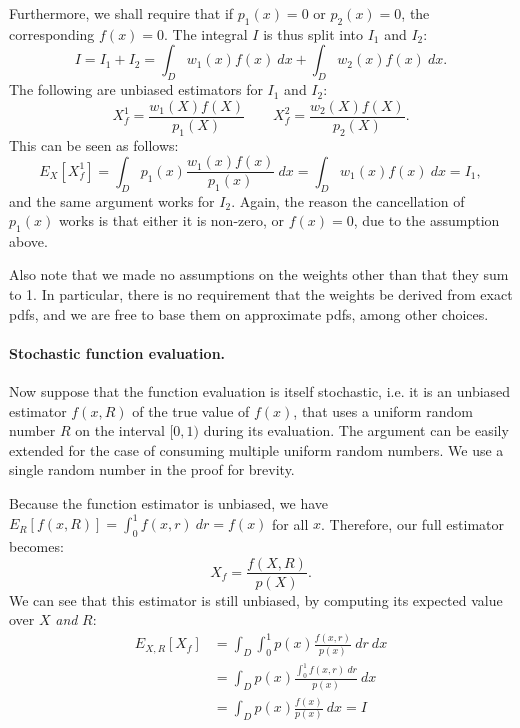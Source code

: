 Furthermore, we shall require that if $p_1(x) = 0$ or $p_2(x) = 0$, the corresponding $f(x) = 0$.
The integral $I$ is thus split into $I_1$ and $I_2$:
\begin{equation}
I = I_1 + I_2 = \int_D w_1(x) f(x) \ dx + \int_D w_2(x) f(x) \ dx.
\end{equation}
The following are unbiased estimators for $I_1$ and $I_2$:
\begin{equation}
X_f^1 = \frac{w_1(X)f(X)}{p_1(X)} \qquad X_f^2 = \frac{w_2(X)f(X)}{p_2(X)}.
\end{equation}
This can be seen as follows:
\begin{equation}
E_X[X_f^1] = \int_D p_1(x) \frac{w_1(x)f(x)}{p_1(x)} \ dx = \int_D w_1(x) f(x) \ dx = I_1,
\end{equation}
and the same argument works for $I_2$. Again, the reason the cancellation of $p_1(x)$ works is that either it is non-zero, or $f(x) = 0$, due to the assumption above.

Also note that we made no assumptions on the weights other than that they sum to 1. In particular, there is no requirement that the weights be derived from exact pdfs, and we are free to base them on approximate pdfs, among other choices.


\paragraph{Stochastic function evaluation.}

Now suppose that the function evaluation is itself stochastic, i.e. it is an unbiased estimator $f(x,R)$ of the true value of $f(x)$, that uses a uniform random number $R$ on the interval $[0,1)$ during its evaluation. The argument can be easily extended for the case of consuming multiple uniform random numbers. We use a single random number in the proof for brevity.

Because the function estimator is unbiased, we have $E_R[f(x,R)] = \int_0^1 f(x,r) \ dr = f(x)$ for all $x$. Therefore, our full estimator becomes:
\begin{equation}
X_f = \frac{f(X,R)}{p(X)}.
\end{equation}
We can see that this estimator is still unbiased, by computing its expected value over $X$ \emph{and} $R$:
\begin{align}
E_{X,R}[X_f] &= \int_D \int_0^1 p(x) \frac{f(x,r)}{p(x)} \ dr \ dx \nonumber \\
			 &= \int_D p(x) \frac{\int_0^1 f(x,r) \ dr}{p(x)} \ dx \nonumber \\
			 &= \int_D p(x) \frac{f(x)}{p(x)} \ dx = I
\end{align}



